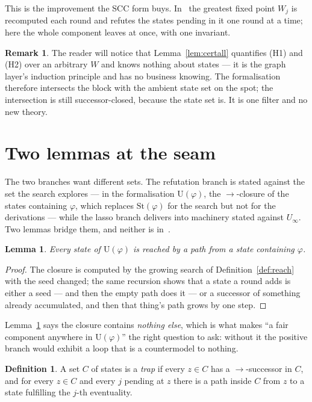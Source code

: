 \documentclass[11pt,a4paper]{article}
\newtheorem{lemma}[theorem]{Lemma}
\theoremstyle{definition}
\newtheorem{definition}[theorem]{Definition}
\newtheorem{remark}[theorem]{Remark}
\newcommand{\St}{\mathrm{St}}
\newcommand{\Ust}{\mathrm{U}}
\begin{document}
This is the improvement the SCC form buys.  In~\cite{m4} the greatest fixed
point $W_j$ is recomputed each round and refutes the states pending in it one
round at a time; here the whole component leaves at once, with one invariant.

\begin{remark}
The reader will notice that Lemma~\ref{lem:certall} quantifies (H1) and (H2)
over an arbitrary $W$ and knows nothing about states --- it is the graph
layer's induction principle and has no business knowing.  The formalisation
therefore intersects the block with the ambient state set on the spot; the
intersection is still successor-closed, because the state set is.  It is one
filter and no new theory.
\end{remark}

\section{Two lemmas at the seam}\label{sec:seam}

The two branches want different sets.  The refutation branch is stated against
the set the search explores --- in the formalisation $\Ust(\varphi)$, the
$\to$-closure of the states containing $\varphi$, which replaces $\St(\varphi)$
for the search but not for the derivations --- while the lasso branch delivers
into machinery stated against $U_\infty$.  Two lemmas bridge them, and neither
is in~\cite{m4}.

\begin{lemma}\label{lem:seeded}
Every state of $\Ust(\varphi)$ is reached by a path from a state containing
$\varphi$.
\end{lemma}

\begin{proof}
The closure is computed by the growing search of Definition~\ref{def:reach}
with the seed changed; the same recursion shows that a state a round adds is
either a seed --- and then the empty path does it --- or a successor of
something already accumulated, and then that thing's path grows by one step.
\end{proof}

Lemma~\ref{lem:seeded} says the closure contains \emph{nothing else}, which is
what makes ``a fair component anywhere in $\Ust(\varphi)$'' the right question
to ask: without it the positive branch would exhibit a loop that is a
countermodel to nothing.

\begin{definition}
A set $C$ of states is a \emph{trap} if every $z\in C$ has a
$\to$-successor in $C$, and for every $z\in C$ and every $j$ pending at $z$
there is a path inside $C$ from $z$ to a state fulfilling the $j$-th
eventuality.
\end{definition}
\end{document}

